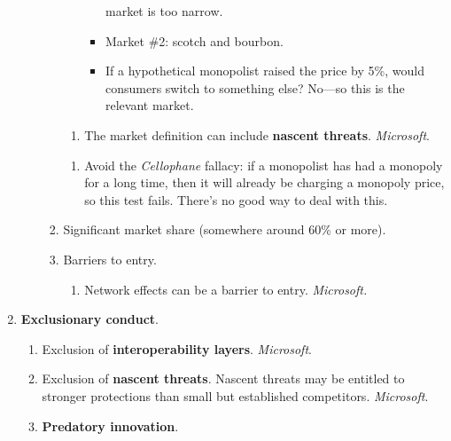 \begin{enumerate}
\begin{enumerate}
\begin{enumerate}
\begin{enumerate}
\begin{itemize}
                    market is too narrow.
                    \item Market \#2: scotch and bourbon.
                    \item If a hypothetical monopolist raised the price by 5\%, 
                    would consumers switch to something else? No—so this is 
                    the relevant market. 
                \end{itemize}
            \end{enumerate}
            \begin{enumerate}
                \item The market definition can include \textbf{nascent 
                threats}. \emph{Microsoft}.
            \end{enumerate}
            \begin{enumerate}
                \item Avoid the \emph{Cellophane} fallacy: if a monopolist has 
                had a monopoly for a long time, then it will already be 
                charging a monopoly price, so this test fails. There's no good 
                way to deal with this.
            \end{enumerate}
            \item Significant market share (somewhere around 60\% or more).
            \item Barriers to entry.
            \begin{enumerate}
                \item Network effects can be a barrier to entry. 
                \emph{Microsoft.}
            \end{enumerate}
        \end{enumerate}
    \end{enumerate}
    \item \textbf{Exclusionary conduct}.
    \begin{enumerate}
        \item Exclusion of \textbf{interoperability layers}. \emph{Microsoft}.
        \item Exclusion of \textbf{nascent threats}. Nascent threats may 
        be entitled to stronger protections than small but established 
        competitors. \emph{Microsoft}.
        \item \textbf{Predatory innovation}.
        \begin{enumerate}

\end{enumerate}
\end{enumerate}
\end{enumerate}
